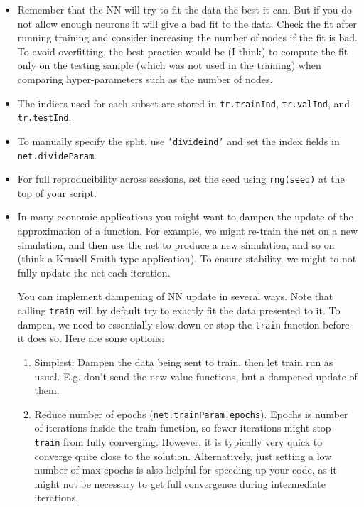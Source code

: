 \documentclass[a4paper,12pt]{article}
\newcommand{\code}[1]{\texttt{#1}}
\begin{document}
\begin{itemize}
\item Remember that the NN will try to fit the data the best it can. But if you do not allow enough neurons it will give a bad fit to the data. Check the fit after running training and consider increasing the number of nodes if the fit is bad. To avoid overfitting, the best practice would be (I think) to compute the fit only on the testing sample (which was not used in the training) when comparing hyper-parameters such as the number of nodes. 

  \item The indices used for each subset are stored in \code{tr.trainInd}, \code{tr.valInd}, and \code{tr.testInd}.
  \item To manually specify the split, use \code{'divideind'} and set the index fields in \code{net.divideParam}.
  \item For full reproducibility across sessions, set the seed using \code{rng(seed)} at the top of your script.



\item In many economic applications you might want to dampen the update of the approximation of a function. For example, we might re-train the net on a new simulation, and then use the net to produce a new simulation, and so on (think a Krusell Smith type application). To ensure stability, we might to not fully update the net each iteration. 

You can implement dampening of NN update in several ways. Note that calling \code{train} will by default try to exactly fit the data presented to it. To dampen, we need to essentially slow down or stop the \code{train} function before it does so. Here are some options:
\begin{enumerate}
\item Simplest: Dampen the data being sent to train, then let train run as usual. E.g. don't send the new value functions, but a dampened update of them. 

\item Reduce number of epochs (\code{net.trainParam.epochs}). Epochs is number of iterations inside the train function, so fewer iterations might stop \code{train} from fully converging. However, it is typically very quick to converge quite close to the solution. Alternatively, just setting a low number of max epochs is also helpful for speeding up your code, as it might not be necessary to get full convergence during intermediate iterations. 


\end{enumerate}
\end{itemize}
\end{document}
